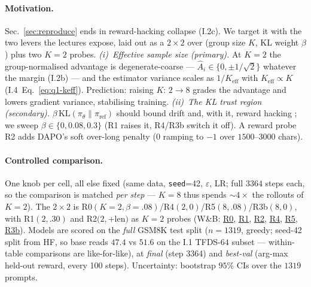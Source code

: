 \documentclass[11pt,a4paper]{article}
\begin{document}
\paragraph{Motivation.}
Sec.~\ref{sec:reproduce} ends in reward-hacking collapse (I.2c). We target it with the
two levers the lectures expose, laid out as a $2{\times}2$ over (group size $K$, KL weight
$\beta$) plus two $K{=}2$ probes. \emph{(i)~Effective sample size (primary).} At $K{=}2$ the
group-normalised advantage is degenerate-coarse --- $\hat A_i\in\{0,\pm1/\sqrt2\}$ whatever
the margin (I.2b) --- and the estimator variance scales as $1/K_{\mathrm{eff}}$ with
$K_{\mathrm{eff}}\!\propto\!K$ (I.4~Eq.~\eqref{eq:q1-keff}). Prediction: raising
$K{:}\,2{\to}8$ grades the advantage and lowers gradient variance, stabilising training.
\emph{(ii)~The KL trust region (secondary).} $\beta\,\mathrm{KL}(\pi_\theta\|\pi_{\mathrm{ref}})$
should bound drift and, with it, reward hacking
\citep{schulman2015trpo,shao2024deepseekmath}; we sweep $\beta\in\{0,0.08,0.3\}$ (R1 raises
it, R4/R3b switch it off). A reward probe R2 adds DAPO's soft over-long penalty
\citep[Eq.~13]{yu2025dapo} ($0$ ramping to $-1$ over $1500$--$3000$ chars).

\paragraph{Controlled comparison.}
One knob per cell, all else fixed (same data, \texttt{seed}{=}42, $\varepsilon$, LR; full
$3364$ steps each, so the comparison is matched \emph{per step} --- $K{=}8$ thus spends
${\sim}4{\times}$ the rollouts of $K{=}2$). The $2{\times}2$ is
R0$(K{=}2,\beta{=}.08)$/R4$(2,0)$/R5$(8,.08)$/R3b$(8,0)$, with R1$(2,.30)$ and R2$(2,$+len$)$
as $K{=}2$ probes (W\&B:
\href{https://wandb.ai/sichengma0514-university-of-cambridge/a8-grpo/runs/8c2785ut}{R0},
\href{https://wandb.ai/sichengma0514-university-of-cambridge/a8-grpo/runs/9p3kota8}{R1},
\href{https://wandb.ai/sichengma0514-university-of-cambridge/a8-grpo/runs/xt3d5b0e}{R2},
\href{https://wandb.ai/sichengma0514-university-of-cambridge/a8-grpo/runs/082vyug5}{R4},
\href{https://wandb.ai/sichengma0514-university-of-cambridge/a8-grpo/runs/qu0uammy}{R5},
\href{https://wandb.ai/sichengma0514-university-of-cambridge/a8-grpo/runs/sgjawrsw}{R3b}). %
Models are scored on the \emph{full} GSM8K test split ($n{=}1319$, greedy; seed-42 split from
HF, so base reads $47.4$ vs $51.6$ on the I.1 TFDS-$64$ subset --- within-table comparisons
are like-for-like), at \emph{final} (step 3364) and \emph{best-val} (arg-max held-out reward,
every 100 steps). Uncertainty: bootstrap $95\%$ CIs over the $1319$ prompts.
\end{document}
